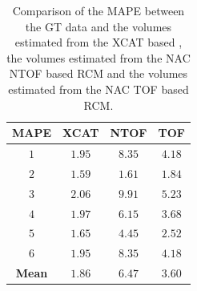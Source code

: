             \begin{table}
                \centering
                
                \captionsetup{singlelinecheck=false, justification=raggedright}
                \caption{Comparison of the \gls{MAPE} between the \gls{GT} data and the volumes estimated from the \gls{XCAT} based , the volumes estimated from the \gls{NAC} \gls{NTOF} based \gls{RCM} and the volumes estimated from the \gls{NAC} \gls{TOF} based \gls{RCM}.}
                
                \resizebox*{1.0\linewidth}{!}
                {
                    \begin{tabular}{||c|ccc||}
                        \hline
                        \textbf{\gls{MAPE}} & \textbf{XCAT} & \textbf{\gls{NTOF}} & \textbf{\gls{TOF}} \\
                        \hline
                        \textbf{$1$} & $1.95$ & $8.35$ & $4.18$ \\
                        \textbf{$2$} & $1.59$ & $1.61$ & $1.84$ \\
                        \textbf{$3$} & $2.06$ & $9.91$ & $5.23$ \\
                        \textbf{$4$} & $1.97$ & $6.15$ & $3.68$ \\
                        \textbf{$5$} & $1.65$ & $4.45$ & $2.52$ \\
                        \textbf{$6$} & $1.95$ & $8.35$ & $4.18$ \\
                        \hline
                        \textbf{Mean} & $1.86$ & $6.47$ & $3.60$ \\
                        \hline
                    \end{tabular}
                } \label{tab:impact_of_tof_on_respiratory_motion_model_estimation_using_pre_gated_no_intra_cycle_motion_nac_pet_results_mape}
            \end{table}
            
